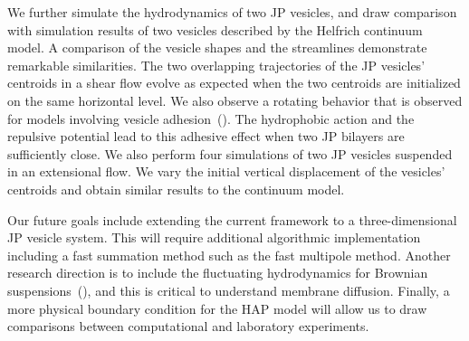 \documentclass[lineno]{jfm}
\begin{document}

We further simulate the hydrodynamics of  two JP vesicles, and draw comparison with simulation results of two vesicles described by the Helfrich
continuum model. A comparison of the vesicle shapes and the streamlines
demonstrate remarkable similarities. The two overlapping trajectories of
the JP vesicles' centroids in a shear flow evolve as expected when the
two centroids are initialized on the same horizontal level. We also
observe a rotating behavior that is observed for models involving
vesicle adhesion~(\cite{qua-vee-you2019}). The hydrophobic action and
the repulsive potential lead to this adhesive effect when two JP
bilayers are sufficiently close. We also perform four simulations of two
JP vesicles suspended in an extensional flow. We vary the initial
vertical displacement of the vesicles' centroids and obtain similar
results to the continuum model.

Our future goals include extending the current framework to a
three-dimensional JP vesicle system. This will require additional
algorithmic implementation including a fast summation method such as the
fast multipole method. Another research direction is to 
%
include the fluctuating hydrodynamics for Brownian suspensions~(\cite{Bao2018}),
and this is critical to understand membrane diffusion. 
Finally, a more physical boundary condition for the
HAP model will allow us to draw comparisons between computational and
laboratory experiments.


\begin{acknowledgments}
\end{acknowledgments}

%
\end{document}
